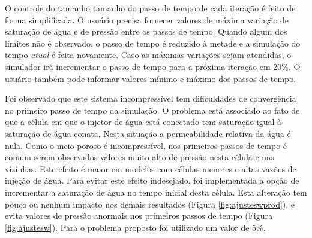 \documentclass[final,5p]{elsarticle}
\numberwithin{equation}{section}
\begin{document}
        O controle do tamanho tamanho do passo de tempo de cada iteração é feito de forma simplificada. O usuário precisa fornecer valores de máxima variação de saturação de água e de pressão entre os passos de tempo. Quando algum dos limites não é observado, o passo de tempo é reduzido à metade e a simulação do tempo \emph{atual} é feita novamente. Caso as máximas variações sejam atendidas, o simulador irá incrementar o passo de tempo para a próxima iteração em 20\%. O usuário também pode informar valores mínimo e máximo dos passos de tempo.

        Foi observado que este sistema incompressível tem dificuldades de convergência no primeiro passo de tempo da simulação. O problema está associado ao fato de que a célula em que o injetor de água está conectado tem saturação igual à saturação de água conata. Nesta situação a permeabilidade relativa da água é nula. Como o meio poroso é incompressível, nos primeiros passos de tempo é comum serem observados valores muito alto de pressão nesta célula e nas vizinhas. Este efeito é maior em modelos com células menores e altas vazões de injeção de água.
        Para evitar este efeito indesejado, foi implementada a opção de incrementar a saturação de água no tempo inicial desta célula. Esta alteração tem pouco ou nenhum impacto nos demais resultados (Figura \ref{fig:ajusteswprod}), e evita valores de pressão anormais nos primeiros passos de tempo (Figura \ref{fig:ajustesw}). Para o problema proposto foi utilizado um valor de 5\%.
\end{document}
